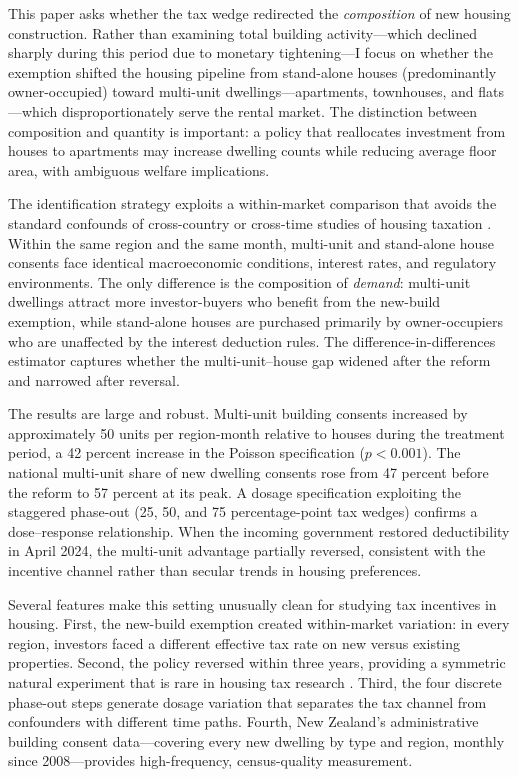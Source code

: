\documentclass[12pt]{article}
\begin{document}
This paper asks whether the tax wedge redirected the \textit{composition} of new housing construction. Rather than examining total building activity---which declined sharply during this period due to monetary tightening---I focus on whether the exemption shifted the housing pipeline from stand-alone houses (predominantly owner-occupied) toward multi-unit dwellings---apartments, townhouses, and flats---which disproportionately serve the rental market. The distinction between composition and quantity is important: a policy that reallocates investment from houses to apartments may increase dwelling counts while reducing average floor area, with ambiguous welfare implications.

The identification strategy exploits a within-market comparison that avoids the standard confounds of cross-country or cross-time studies of housing taxation \citep{HilberTurner2014, FaticaPrammer2018}. Within the same region and the same month, multi-unit and stand-alone house consents face identical macroeconomic conditions, interest rates, and regulatory environments. The only difference is the composition of \textit{demand}: multi-unit dwellings attract more investor-buyers who benefit from the new-build exemption, while stand-alone houses are purchased primarily by owner-occupiers who are unaffected by the interest deduction rules. The difference-in-differences estimator captures whether the multi-unit--house gap widened after the reform and narrowed after reversal.

The results are large and robust. Multi-unit building consents increased by approximately 50 units per region-month relative to houses during the treatment period, a 42 percent increase in the Poisson specification ($p < 0.001$). The national multi-unit share of new dwelling consents rose from 47 percent before the reform to 57 percent at its peak. A dosage specification exploiting the staggered phase-out (25, 50, and 75 percentage-point tax wedges) confirms a dose--response relationship. When the incoming government restored deductibility in April 2024, the multi-unit advantage partially reversed, consistent with the incentive channel rather than secular trends in housing preferences.

Several features make this setting unusually clean for studying tax incentives in housing. First, the new-build exemption created within-market variation: in every region, investors faced a different effective tax rate on new versus existing properties. Second, the policy reversed within three years, providing a symmetric natural experiment that is rare in housing tax research \citep{Sims2007}. Third, the four discrete phase-out steps generate dosage variation that separates the tax channel from confounders with different time paths. Fourth, New Zealand's administrative building consent data---covering every new dwelling by type and region, monthly since 2008---provides high-frequency, census-quality measurement.
\end{document}
